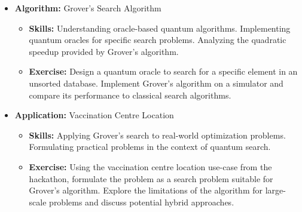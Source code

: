 \begin{itemize}
    \item \textbf{Algorithm:} Grover's Search Algorithm
    \begin{itemize}
        \item \textbf{Skills:} Understanding oracle-based quantum algorithms. Implementing quantum oracles for specific search problems. Analyzing the quadratic speedup provided by Grover's algorithm.
        \item \textbf{Exercise:} Design a quantum oracle to search for a specific element in an unsorted database. Implement Grover's algorithm on a simulator and compare its performance to classical search algorithms.
    \end{itemize}
    
    \item \textbf{Application:} Vaccination Centre Location
    \begin{itemize}
        \item \textbf{Skills:} Applying Grover's search to real-world optimization problems. Formulating practical problems in the context of quantum search.
        \item \textbf{Exercise:} Using the vaccination centre location use-case from the hackathon, formulate the problem as a search problem suitable for Grover's algorithm. Explore the limitations of the algorithm for large-scale problems and discuss potential hybrid approaches.
    \end{itemize}
\end{itemize}

